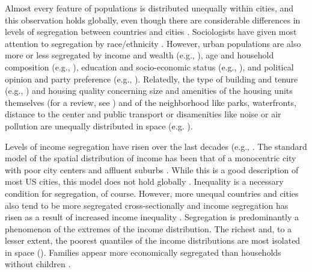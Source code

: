 \documentclass[a4paper,12pt]{article}
\begin{document}
Almost every feature of populations is distributed unequally within cities, and this observation holds globally, even though there are considerable differences in levels of segregation between countries and cities \citep{quillianSocioeconomicSegregationLarge2016, oecdDividedCitiesUnderstanding2018, vanhamUrbanSocioEconomicSegregation2021}. Sociologists have given most attention to segregation by race/ethnicity \citep{charlesDynamicsRacialResidential2003}. However, urban populations are also more or less segregated by income and wealth (e.g., \cite{reardonIncomeInequalityIncome2011, oecdDividedCitiesUnderstanding2018, helbigHinterFassadenZur2023}), age and household composition (e.g., \cite{owensInequalityChildrenContexts2016, loganBirdsFeatherSocial2016, mutganIncomeInequalityResidential2023}), education and socio-economic status (e.g., \cite{quillianSocioeconomicSegregationLarge2016, helbigHinterFassadenZur2023}), and political opinion and party preference (e.g., \cite{mummoloWhyPartisansNot2017}). 
Relatedly, the type of building and tenure (e.g., \cite{loufPatternsResidentialSegregation2016, oecdDividedCitiesUnderstanding2018, owensBuildingInequalityHousing2019}) and housing quality concerning size and amenities of the housing units themselves (for a review, see \cite{chauCriticalReviewLiterature2003}) and of the neighborhood like parks, waterfronts, distance to the center and public transport or disamenities like noise or air pollution are unequally distributed in space (e.g. \cite{leeNaturalAmenitiesNeighbourhood2018, heblichEastSideStoryHistorical2021, ruttenauerEnvironmentalInequalityResidential2021}).

Levels of income segregation have risen over the last decades (e.g., \cite{jargowskyTakeMoneyRun1996, reardonIncomeInequalityIncome2011, vanhamUrbanSocioEconomicSegregation2021}. The standard model of the spatial distribution of income has been that of a monocentric city with poor city centers and affluent suburbs \citep{bruecknerLecturesUrbanEconomics2011, rosenthalChangePersistenceEconomic2015}. While this is a good description of most US cities, this model does not hold globally \citep{bruecknerWhyCentralParis1999, quillianSocioeconomicSegregationLarge2016, gaigneWhoLivesWhere2022}. Inequality is a necessary condition for segregation, of course. However, more unequal countries and cities also tend to be more segregated cross-sectionally \citep{quillianSocioeconomicSegregationLarge2016, oecdDividedCitiesUnderstanding2018, vanhamUrbanSocioEconomicSegregation2021} and income segregation has risen as a result of increased income inequality \citep{reardonIncomeInequalityIncome2011, vanhamUrbanSocioEconomicSegregation2021, mutganIncomeInequalityResidential2023}. Segregation is predominantly a phenomenon of the extremes of the income distribution. The richest and, to a lesser extent, the poorest quantiles of the income distributions are most isolated in space (\cite{reardonIncomeInequalityIncome2011, quillianSocioeconomicSegregationLarge2016, oecdDividedCitiesUnderstanding2018, mutganIncomeInequalityResidential2023}). Families appear more economically segregated than households without children \citep{owensInequalityChildrenContexts2016, mutganIncomeInequalityResidential2023}.
\end{document}
